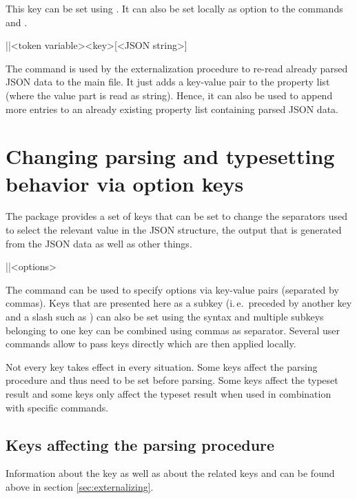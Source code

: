 \documentclass[a4paper]{article}
\begin{document}
{{This key can be set using \macro{\JSONParseSet}. It can also be set locally as option to the commands \macro{\JSONParse} and \macro{\JSONParseFromFile}.

\begin{macrodef}
|\JSONParsePut|{<token variable>}{<key>}[<JSON string>]
\end{macrodef}
The command \macro{\JSONParsePut} is used by the externalization procedure to re-read already parsed JSON data to the main file. It just adds a key-value pair to the property list (where the value part is read as string). Hence, it can also be used to append more entries to an already existing property list containing parsed JSON data.

\section{Changing parsing and typesetting behavior via option keys}\label{sec:options}

The package provides a set of keys that can be set to change the separators used to select the relevant value in the JSON structure, the output that is generated from the JSON data as well as other things.

\begin{macrodef}
|\JSONParseSet|{<options>}
\end{macrodef}
The command \macro{\JSONParseSet} can be used to specify options via key-value pairs (separated by commas). Keys that are presented here as a subkey (i.\,e.\ preceded by another key and a slash such as ) can also be set using the syntax  and multiple subkeys belonging to one key can be combined using commas as separator. Several user commands allow to pass keys directly which are then applied locally.

Not every key takes effect in every situation. Some keys affect the parsing procedure and thus need to be set before parsing. Some keys affect the typeset result and some keys only affect the typeset result when used in combination with specific commands.

\subsection{Keys affecting the parsing procedure}

Information about the key  as well as about the related keys  and  can be found above in section \ref{sec:externalizing}.

}}
\end{document}
